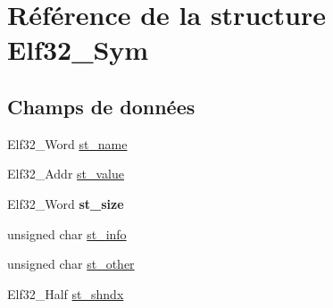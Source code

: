 \hypertarget{structElf32__Sym}{\section{Référence de la structure Elf32\+\_\+\+Sym}
\label{structElf32__Sym}
}
\subsection*{Champs de données}
\begin{DoxyCompactItemize}
\item 
Elf32\+\_\+\+Word \hyperlink{structElf32__Sym_a6a972b30868879f8a1e071e0c45e5031}{st\+\_\+name}
\item 
Elf32\+\_\+\+Addr \hyperlink{structElf32__Sym_abf8ff76884bc5e2acb5f7eb42f733c2e}{st\+\_\+value}
\item 
\hypertarget{structElf32__Sym_a1b410e69fecd2610bc7e58d2b0245053}{Elf32\+\_\+\+Word {\bfseries st\+\_\+size}}\label{structElf32__Sym_a1b410e69fecd2610bc7e58d2b0245053}

\item 
unsigned char \hyperlink{structElf32__Sym_a7d131c44ec48708b1c98f9b00ca9d528}{st\+\_\+info}
\item 
unsigned char \hyperlink{structElf32__Sym_a2e1bf6bedb5180f74ea8cbaf9cedfd36}{st\+\_\+other}
\item 
Elf32\+\_\+\+Half \hyperlink{structElf32__Sym_a46e54847ab00fbea62df8ee5dff8dec6}{st\+\_\+shndx}
\end{DoxyCompactItemize}


